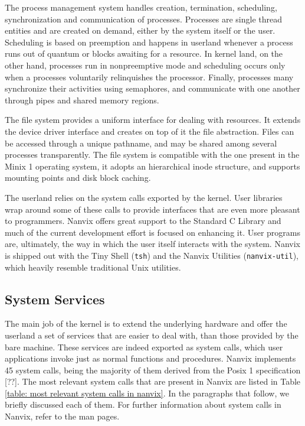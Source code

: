 \documentclass[10pt,a4paper]{article}
\begin{document}
The process management system handles creation, termination, scheduling, synchronization and communication of processes. Processes are single thread entities and are created on demand, either by the system itself or the user. Scheduling is based on preemption and happens in userland whenever a process runs out of quantum or blocks awaiting for a resource. In kernel land, on the other hand, processes run in nonpreemptive mode and scheduling occurs only when a processes voluntarily relinquishes the processor. Finally, processes many synchronize their activities using semaphores, and communicate with one another through pipes and shared memory regions.

The file system provides a uniform interface for dealing with resources. It extends the device driver interface and creates on top of it the file abstraction. Files can be accessed through a unique pathname, and may be shared among several processes transparently.   The file system is compatible with the one present in the Minix 1 operating system, it adopts an hierarchical inode structure, and supports mounting points and disk block caching.

The userland relies on the system calls exported by the kernel. User libraries wrap around some of these calls to provide interfaces that are even more pleasant to programmers. Nanvix offers great support to the Standard C Library and much of the current development effort is focused on enhancing it. User programs are, ultimately, the way in which the user itself interacts with the system. Nanvix is shipped out with the Tiny Shell (\texttt{tsh}) and the Nanvix Utilities (\texttt{nanvix-util}), which heavily resemble traditional Unix utilities. 

\subsection{System Services}
\label{section: system services}

The main job of the kernel is to extend the underlying hardware and offer the userland a set of services that are easier to deal with, than those provided by the bare machine. These services are indeed exported as system calls, which user applications invoke just as normal functions and procedures. Nanvix implements 45 system calls, being the majority of them derived from the Posix 1 specification [??]. The most relevant system calls that are present in Nanvix are listed in Table \ref{table: most relevant system calls in nanvix}. In the paragraphs that follow, we briefly discussed each of them. For further information about system calls in Nanvix, refer to the man pages.
\end{document}
